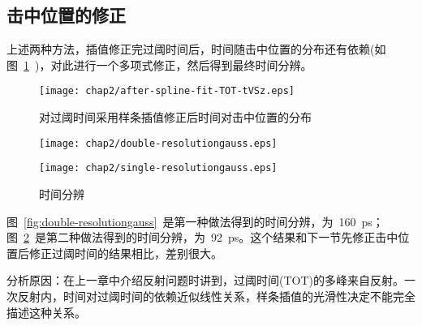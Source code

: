 \subsection{击中位置的修正}
上述两种方法，插值修正完过阈时间后，时间随击中位置的分布还有依赖(如图~\ref{fig:after-spline-fit-TOT-tVSz}~)，对此进行一个多项式修正，然后得到最终时间分辨。

\begin{figure}[!h]
  \centering
  \texttt{[image: chap2/after-spline-fit-TOT-tVSz.eps]}
  \caption{对过阈时间采用样条插值修正后时间对击中位置的分布}
  \label{fig:after-spline-fit-TOT-tVSz}
\end{figure}

\begin{figure}[!h]
\begin{minipage}[!h]{0.48\linewidth}
\centering
\texttt{[image: chap2/double-resolutiongauss.eps]}
\label{fig:double-resolutiongauss}
\end{minipage}%
\hfill
\begin{minipage}[!h]{0.48\linewidth}
\centering
\texttt{[image: chap2/single-resolutiongauss.eps]}
\label{fig:single-resolutiongauss}
\end{minipage}
\caption{时间分辨}
\end{figure}

图~\ref{fig:double-resolutiongauss}~是第一种做法得到的时间分辨，为~160~ps；图~\ref{fig:single-resolutiongauss}~是第二种做法得到的时间分辨，为~92~ps。这个结果和下一节先修正击中位置后修正过阈时间的结果相比，差别很大。

分析原因：在上一章中介绍反射问题时讲到，过阈时间(TOT)的多峰来自反射。一次反射内，时间对过阈时间的依赖近似线性关系，样条插值的光滑性决定不能完全描述这种关系。

